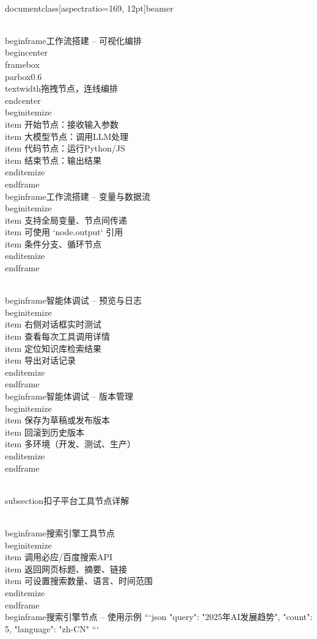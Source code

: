 \\documentclass[aspectratio=169, 12pt]{beamer}
\begin{document}
\\begin{frame}{工作流搭建 – 可视化编排}
\\begin{center}
\\framebox{\\parbox{0.6\\textwidth}{拖拽节点，连线编排}}
\\end{center}
\\begin{itemize}
    \\item 开始节点：接收输入参数
    \\item 大模型节点：调用LLM处理
    \\item 代码节点：运行Python/JS
    \\item 结束节点：输出结果
\\end{itemize}
\\end{frame}
\\begin{frame}{工作流搭建 – 变量与数据流}
\\begin{itemize}
    \\item 支持全局变量、节点间传递
    \\item 可使用 `{{node.output}}` 引用
    \\item 条件分支、循环节点
\\end{itemize}
\\end{frame}

\\begin{frame}{智能体调试 – 预览与日志}
\\begin{itemize}
    \\item 右侧对话框实时测试
    \\item 查看每次工具调用详情
    \\item 定位知识库检索结果
    \\item 导出对话记录
\\end{itemize}
\\end{frame}
\\begin{frame}{智能体调试 – 版本管理}
\\begin{itemize}
    \\item 保存为草稿或发布版本
    \\item 回滚到历史版本
    \\item 多环境（开发、测试、生产）
\\end{itemize}
\\end{frame}

\\subsection{扣子平台工具节点详解}

\\begin{frame}{搜索引擎工具节点}
\\begin{itemize}
    \\item 调用必应/百度搜索API
    \\item 返回网页标题、摘要、链接
    \\item 可设置搜索数量、语言、时间范围
\\end{itemize}
\\end{frame}
\\begin{frame}{搜索引擎节点 – 使用示例}
```json
{
  "query": "2025年AI发展趋势",
  "count": 5,
  "language": "zh-CN"
}
```
\end{document}
